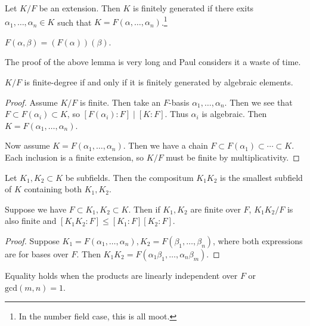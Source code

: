 \documentclass[10pt, twoside]{article}
\begin{document}
    \begin{defn}
        Let $K/F$ be an extension. Then $K$ is finitely generated if there exits $\alpha_1, \ldots, \alpha_n \in K$ such that $K = F(\alpha, \ldots, \alpha_n)$.\footnote{In the number field case, this is all moot.}
    \end{defn}

    \begin{lem}
        $F(\alpha, \beta) = (F(\alpha))(\beta)$.
    \end{lem}

    The proof of the above lemma is very long and Paul considers it a waste of time.

    \begin{thm}
        $K/F$ is finite-degree if and only if it is finitely generated by algebraic elements.
        \begin{proof}
            Assume $K/F$ is finite. Then take an $F$-basis $\alpha_1, \ldots, \alpha_n$. Then we see that $F \subset F(\alpha_i) \subset K$, so $[F(\alpha_i):F] \mid [K:F]$. Thus $\alpha_i$ is algebraic. Then $K = F(\alpha_1, \ldots, \alpha_n)$.

            Now assume $K = F(\alpha_1, \ldots, \alpha_n)$. Then we have a chain $F \subset F(\alpha_1) \subset \cdots \subset K$. Each inclusion is a finite extension, so $K/F$ must be finite by multiplicativity.
        \end{proof}
    \end{thm}

    \begin{defn}[Compositum]
        Let $K_1,K_2 \subset K$ be subfields. Then the compositum $K_1K_2$ is the smallest subfield of $K$ containing both $K_1, K_2$.
    \end{defn}

    \begin{prop}
        Suppose we have $F \subset K_1,K_2 \subset K$. Then if $K_1, K_2$ are finite over $F$, $K_1K_2/F$ is also finite and $[K_1K_2:F] \leq [K_1:F][K_2:F]$.
        \begin{proof}
            Suppose $K_1 = F(\alpha_1, \ldots, \alpha_n), K_2 = F(\beta_1, \ldots, \beta_n)$, where both expressions are for bases over $F$. Then $K_1K_2 = F(\alpha_1\beta_1, \ldots, \alpha_n\beta_m)$.
        \end{proof}
    \end{prop}

    \begin{rmk}
        Equality holds when the products are linearly independent over $F$ or $\mathrm{gcd}(m,n) = 1$.
    \end{rmk}
\end{document}

